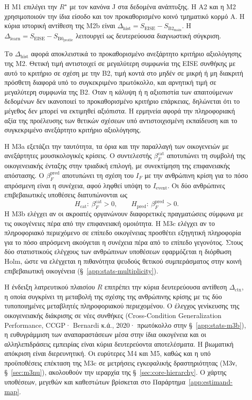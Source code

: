 \documentclass[11pt,a4paper]{article}
\begin{document}
Η Μ1 επιλέγει την $R^\star$ με τον κανόνα J στα δεδομένα ανάπτυξης. Η Α2 και η Μ2 χρησιμοποιούν την ίδια είσοδο και τον προκαθορισμένο κοινό τμηματικό κορμό A. Η κύρια ιστορική αντίθεση της Μ2b είναι $\Delta_{\mathrm{hist}}=S_{\mathrm{EISE}}-S_{\mathrm{B2}_{\mathrm{main}}}$. Η $\Delta_{\mathrm{learn}}=S_{\mathrm{EISE}}-S_{\mathrm{B0}_{\mathrm{profile}}}$ λειτουργεί ως δευτερεύουσα διαγνωστική σύγκριση.

Το $\Delta_{\mathrm{hist}}$ αφορά αποκλειστικά το προκαθορισμένο ανεξάρτητο κριτήριο αξιολόγησης της M2. Θετική τιμή αντιστοιχεί σε μεγαλύτερη συμφωνία της EISE συνθήκης με αυτό το κριτήριο σε σχέση με την B2, τιμή κοντά στο μηδέν σε μικρή ή μη διακριτή πρόσθετη διαφορά υπό το συγκεκριμένο πρωτόκολλο, και αρνητική τιμή σε μεγαλύτερη συμφωνία της B2. Όταν η κάλυψη ή η αξιοπιστία των απαιτούμενων δεδομένων δεν ικανοποιεί το προκαθορισμένο κριτήριο επάρκειας, δηλώνεται ότι το μέγεθος δεν μπορεί να εκτιμηθεί αξιόπιστα. Η ερμηνεία αφορά την πληροφοριακή αξία της προέλευσης των θετικών σχέσεων υπό αντιστοιχισμένη εκπαίδευση και το συγκεκριμένο ανεξάρτητο κριτήριο αξιολόγησης.



Η M3a εξετάζει την ταυτότητα, τα όρια και την παραλλαγή των οικογενειών με ανεξάρτητες μουσικολογικές κρίσεις. Ο συντελεστής $\beta_F^{\mathrm{cat}}$ αποτυπώνει τη συμβολή της οικογενειακής ένταξης στην τριαδική επιλογή, με συνεκτίμηση της επιφανειακής απόστασης. Ο $\beta_F^{\mathrm{pred}}$ αποτυπώνει τη σχέση του $I_F$ με την ανθρώπινη κρίση για το πόσο απρόσμενη είναι η συνέχεια, αφού ληφθεί υπόψη το $I_{\mathrm{event}}$. Οι δύο ανθρώπινες επιβεβαιωτικές υποθέσεις διατυπώνονται ως
\[
H_{\mathrm{cat}}:\ \beta_F^{\mathrm{cat}}>0,
\qquad
H_{\mathrm{pred}}:\ \beta_F^{\mathrm{pred}}>0.
\]
Η M3b ελέγχει αν οι ακροατές οργανώνουν διαφορετικές πραγματώσεις σύμφωνα με τις οικογένειες πέρα από την επιφανειακή ομοιότητα. Η M3c ελέγχει αν το πληροφοριακό περιεχόμενο σε επίπεδο οικογένειας προσθέτει εξηγητική πληροφορία για το πόσο απρόσμενη ακούγεται η συνέχεια πέρα από το επίπεδο γεγονότος. Στους δύο στατιστικούς ελέγχους των ανθρώπινων υποθέσεων εφαρμόζεται η διόρθωση Holm, ώστε να ελέγχεται η πιθανότητα ψευδούς θετικού συμπεράσματος στην κοινή επιβεβαιωτική οικογένεια (§~\ref{app:stats-multiplicity}).

Η ένδειξη λατρευτικού πλαισίου $R$ επιτρέπει την κύρια δευτερεύουσα αντίθεση $\Delta_{\mathrm{ctx}}$, η οποία συγκρίνει τη μεταβολή της σχέσης της ανθρώπινης κρίσης με τις δύο τυποποιημένες μεταβλητές πληροφοριακού περιεχομένου. Ο έλεγχος γενίκευσης της οικογενειακής διάκρισης σε νέες συνθήκες (Cross-Condition Generalization Performance, CCGP· Bernardi κ.ά., 2020· πρωτόκολλο στην §~\ref{app:stats-m3b}), η ευθυγράμμιση των αναπαραστάσεων μέσα στην ίδια οικογένεια και οι αλληλεπιδράσεις εμπειρίας είναι κύρια δευτερεύοντα αποτελέσματα. Η βιωματική απόκριση είναι διερευνητική. Οι ευρύτερες M4 και M5, καθώς και η υπό προϋποθέσεις επέκταση της M3c σε μετρήσεις εγκεφαλικής δραστηριότητας (M3ν, §~\ref{sec:m3nu}), ακολουθούν την ιεραρχία της §~\ref{sec:core-hierarchy}. Ο χάρτης υποθέσεων, μεγεθών και καθεστώτων βρίσκεται στο Παράρτημα~\ref{app:estimand-map}.
\end{document}
